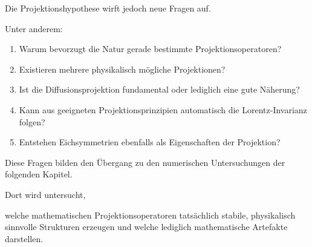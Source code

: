 Die Projektionshypothese wirft jedoch neue Fragen auf.

Unter anderem:

\begin{enumerate}

\item
Warum bevorzugt die Natur gerade bestimmte Projektionsoperatoren?

\item
Existieren mehrere physikalisch mögliche Projektionen?

\item
Ist die Diffusionsprojektion fundamental oder lediglich eine gute Näherung?

\item
Kann aus geeigneten Projektionsprinzipien automatisch die Lorentz-Invarianz folgen?

\item
Entstehen Eichsymmetrien ebenfalls als Eigenschaften der Projektion?

\end{enumerate}

Diese Fragen bilden den Übergang zu den numerischen Untersuchungen der folgenden Kapitel.

Dort wird untersucht,

welche mathematischen Projektionsoperatoren tatsächlich stabile, physikalisch sinnvolle Strukturen erzeugen und welche lediglich mathematische Artefakte darstellen.

